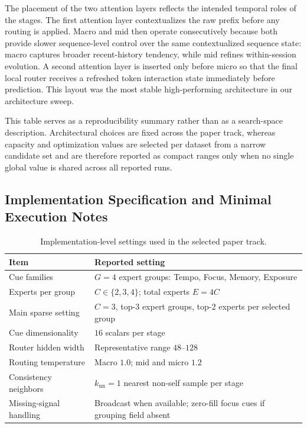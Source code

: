 \documentclass[sigconf,review,anonymous]{acmart}
\begin{document}
The placement of the two attention layers reflects the intended temporal roles of the stages. The first attention layer contextualizes the raw prefix before any routing is applied. Macro and mid then operate consecutively because both provide slower sequence-level control over the same contextualized sequence state: macro captures broader recent-history tendency, while mid refines within-session evolution. A second attention layer is inserted only before micro so that the final local router receives a refreshed token interaction state immediately before prediction. This layout was the most stable high-performing architecture in our architecture sweep.

This table serves as a reproducibility summary rather than as a search-space description. Architectural choices are fixed across the paper track, whereas capacity and optimization values are selected per dataset from a narrow candidate set and are therefore reported as compact ranges only when no single global value is shared across all reported runs.

\subsection{Implementation Specification and Minimal Execution Notes}

\begin{table}[H]
  \centering
  \caption{Implementation-level settings used in the selected paper track.}
  \label{tab:appendix-implementation-spec}
  \footnotesize
  \setlength{\tabcolsep}{4pt}
  \renewcommand{\arraystretch}{1.07}
  \begin{tabularx}{\columnwidth}{@{}L{0.30\columnwidth}>{\raggedright\arraybackslash}X@{}}
    \toprule
    Item & Reported setting \\
    \midrule
    Cue families & $G=4$ expert groups: Tempo, Focus, Memory, Exposure \\
    Experts per group & $C\in\{2,3,4\}$; total experts $E=4C$ \\
    Main sparse setting & $C=3$, top-$3$ expert groups, top-$2$ experts per selected group \\
    Cue dimensionality & $16$ scalars per stage \\
    Router hidden width & Representative range $48$--$128$ \\
    Routing temperature & Macro $1.0$; mid and micro $1.2$ \\
    Consistency neighbors & $k_{\mathrm{nn}}=1$ nearest non-self sample per stage \\
    Missing-signal handling & Broadcast when available; zero-fill focus cues if grouping field absent \\
    \bottomrule
  \end{tabularx}
\end{table}
\end{document}
